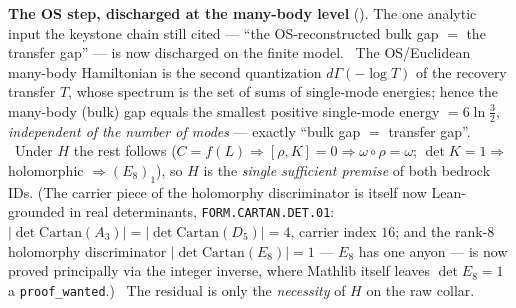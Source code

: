 \par\smallskip\noindent\textbf{The OS step, discharged at the many-body level}
(). The one analytic input the keystone chain still cited --- ``the
OS-reconstructed bulk gap $=$ the transfer gap'' --- is now discharged on the finite model. \mE\ The OS/Euclidean
many-body Hamiltonian is the second quantization $d\Gamma(-\log T)$ of the recovery transfer $T$, whose spectrum is
the set of sums of single-mode energies; hence the many-body (bulk) gap equals the smallest positive single-mode
energy $=6\ln\tfrac32$, \emph{independent of the number of modes} --- exactly ``bulk gap $=$ transfer gap''. \mE\
Under $H$ the rest follows ($C{=}f(L)\Rightarrow[\rho,K]{=}0\Rightarrow\omega\circ\rho{=}\omega$; $\det K{=}1\Rightarrow$
holomorphic $\Rightarrow(E_8)_1$), so $H$ is the \emph{single sufficient premise} of both bedrock IDs. (The carrier
piece of the holomorphy discriminator is itself now Lean-grounded in real determinants, \texttt{FORM.CARTAN.DET.01}:
$|\det\mathrm{Cartan}(A_3)|{=}|\det\mathrm{Cartan}(D_5)|{=}4$, carrier index $16$; and the rank-8 holomorphy
discriminator $|\det\mathrm{Cartan}(E_8)|{=}1$ --- $E_8$ has one anyon --- is now proved principally via the
integer inverse, where Mathlib itself leaves $\det E_8{=}1$ a \texttt{proof\_wanted}.) \mO\ The residual is only the
\emph{necessity} of $H$ on the raw collar.

